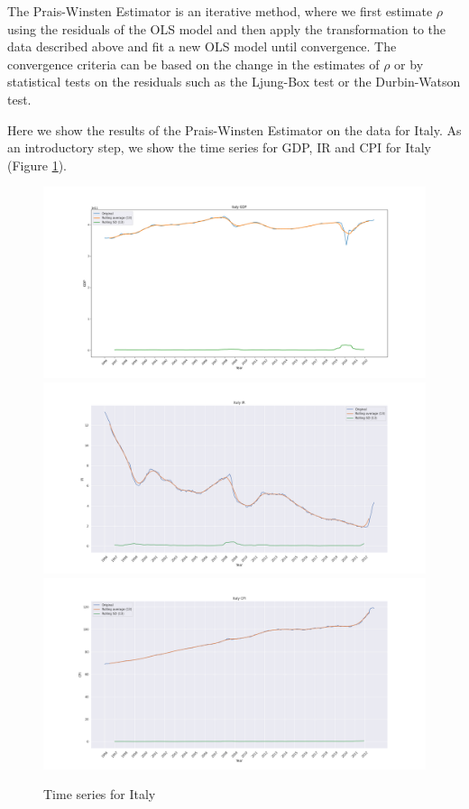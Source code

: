 The Prais-Winsten Estimator is an iterative method, where we first estimate $\rho$ using the residuals of the OLS model and then apply the transformation to the data described above and fit a new OLS model until convergence. The convergence criteria can be based on the change in the estimates of $\rho$ or by statistical tests on the residuals such as the Ljung-Box test or the Durbin-Watson test.

Here we show the results of the Prais-Winsten Estimator on the data for Italy. As an introductory step, we show the time series for GDP, IR and CPI for Italy (Figure \ref{fig:italy_ts}).
\begin{figure}[H]
  \includegraphics[width=.9\linewidth]{imgs/italy_gdp.png}
  \includegraphics[width=.9\linewidth]{imgs/italy_ir.png}
  \includegraphics[width=.9\linewidth]{imgs/italy_cpi.png}
  \caption{Time series for Italy}
  \label{fig:italy_ts}
\end{figure}



